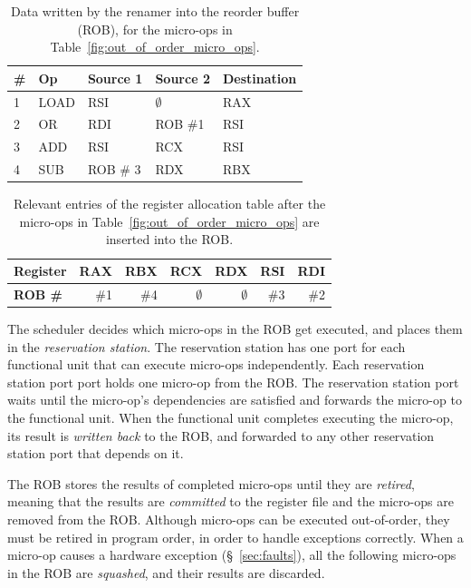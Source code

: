 \begin{table}[hbt]
  \centering
  \begin{tabular}{| l | l | l | l | l |}
  \hline
  \textbf{\#} & \textbf{Op} & \textbf{Source 1} & \textbf{Source 2} &
  \textbf{Destination}\\
  \hline
  1 & LOAD & RSI & $\emptyset$ & RAX \\
  \hline
  2 & OR & RDI & ROB \#1 & RSI \\
  \hline
  3 & ADD & RSI & RCX & RSI \\
  \hline
  4 & SUB & ROB \# 3 & RDX & RBX \\
  \hline
  \end{tabular}
  \caption{
    Data written by the renamer into the reorder buffer (ROB), for the
    micro-ops in Table~\ref{fig:out_of_order_micro_ops}.
  }
  \label{fig:out_of_order_rob}
\end{table}

\begin{table}[hbt]
  \centering
  \begin{tabular}{| l | r | r | r | r | r | r |}
  \hline
  \textbf{Register} & RAX & RBX & RCX & RDX & RSI & RDI \\
  \hline
  \textbf{ROB \#} & \#1 & \#4 & $\emptyset$ & $\emptyset$ & \#3 & \#2 \\
  \hline
  \end{tabular}
  \caption{
    Relevant entries of the register allocation table after the micro-ops in
    Table~\ref{fig:out_of_order_micro_ops} are inserted into the ROB.
  }
  \label{fig:out_of_order_rat}
\end{table}


The scheduler decides which micro-ops in the ROB get executed, and places them
in the \textit{reservation station}. The reservation station has one port
for each functional unit that can execute micro-ops independently. Each
reservation station port port holds one micro-op from the ROB. The reservation
station port waits until the micro-op's dependencies are satisfied and forwards
the micro-op to the functional unit. When the functional unit completes
executing the micro-op, its result is \textit{written back} to the ROB, and
forwarded to any other reservation station port that depends on it.

The ROB stores the results of completed micro-ops until they are
\textit{retired}, meaning that the results are \textit{committed} to the
register file and the micro-ops are removed from the ROB. Although micro-ops
can be executed out-of-order, they must be retired in program order, in order
to handle exceptions correctly. When a micro-op causes a hardware exception
(\S~\ref{sec:faults}), all the following micro-ops in the ROB are
\textit{squashed}, and their results are discarded.

